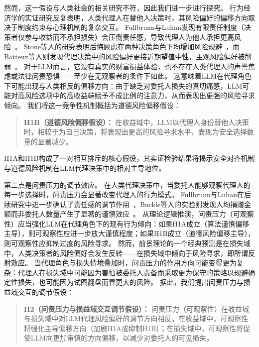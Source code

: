 然而，这一假设与人类社会的相关研究不符，因此我们进一步进行探究。
行为经济学的实证研究反复表明，人类代理人在替他人决策时，其风险偏好的偏移方向取决于制度约束与心理机制的复杂交互。
Fullbrunn与Luhan发现有限责任制度（决策者仅参与收益而不承担损失）会压倒责任感，导致代理人为他人承担更高风险~\cite{Fullbrunn2019Responsibility}。
Stone等人的研究表明后悔顾虑在两种决策角色下均增加风险规避~\cite{Stone2002Risk}，而Batteux等人则发现代理决策中的风险偏好更接近期望值中性，主观风险偏好被削弱~\cite{Batteux2017Risk}。
对于LLM而言，它没有真实的财富损益体验，也不存在人类代理人的声誉焦虑或法律问责恐惧——至少在无观察者的条件下如此。
这意味着LLM在代理角色下可能出现与人类相反的偏移方向：由于缺乏对委托人损失的真切痛感，LLM可能对高风险选项中的高收益端赋予不成比例的注意力，从而表现出更强的风险寻求倾向。
我们将这一竞争性机制概括为道德风险偏移假设：
\begin{quote}
\textbf{H1B（道德风险偏移假设）：} 在收益域中，LLM以代理人身份替他人决策时，相较于为自己决策，将表现出更高的风险寻求水平，表现为安全选择数量的显著减少。
\end{quote}

H1A和H1B构成了一对相互排斥的核心假设，其实证检验结果将揭示安全对齐机制与道德风险机制在LLM代理决策中的相对主导地位。

第二点是问责压力的调节效应。
在人类代理决策中，当委托人能够观察代理人的每一步选择时，问责压力会显著改变代理人的行为模式。
Fullbrunn与Luhan在后续研究中进一步确认了责任感的调节作用~\cite{Fullbrunn2019Responsibility}，Buckle等人的实验则发现人均捐赠金额而非委托人数量产生了显著的谨慎效应~\cite{Buckle2024Needs}。
从理论逻辑推演，问责压力（可观察性）应当强化LLM在代理角色下的现有行为倾向：如果H1A成立（算法谨慎偏移主导），则可观察性应进一步放大谨慎程度；如果H1B成立（道德风险偏移主导），则可观察性应抑制过度的风险寻求。
然而，前景理论的一个经典预测是在损失域中，人类决策者的风险偏好会发生反转——在损失域中倾向于风险寻求，即所谓反射效应。
当代理角色与损失情境叠加时，问责压力的作用方向可能变得更为复杂：代理人在损失域中可能因为害怕被委托人责备而采取更为保守的策略以规避确定性损失，也可能因为试图翻盘而冒更大的风险。
据此，我们提出问责压力与损益域交互的调节假设：
\begin{quote}
\textbf{H2（问责压力与损益域交互调节假设）：} 问责压力（可观察性）在收益域与损失域中对LLM代理风险偏好的调节方向相反。在收益域中，可观察性将强化主导偏移方向（加剧H1A或抑制H1B）；在损失域中，可观察性将促使LLM向更加审慎的方向偏移，以减少对委托人的可见损失。
\end{quote}

